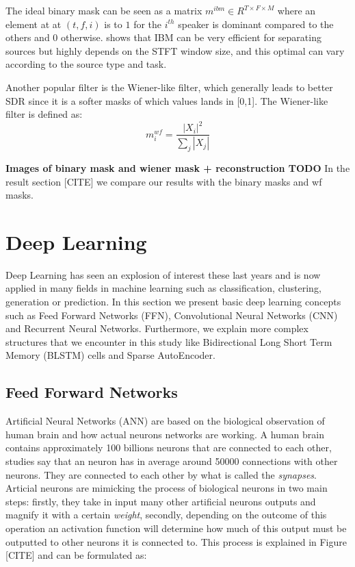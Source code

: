 \documentclass[master,final,11pt]{iscs-thesis}
\begin{document}
The ideal binary mask can be seen as a matrix $m^{ibm} \in R^{T\times F \times M}$ where an element at at $(t,f,i)$ is to $1$ for the $i^{th}$ speaker is dominant compared to the others and $0$ otherwise. \cite{IBM} shows that IBM can be very efficient for separating sources but highly depends on the STFT window size, and this optimal can vary according to the source type and task.

Another popular filter is the Wiener-like filter, which generally leads to better SDR since it is a softer masks of which values lands in [0,1]. The Wiener-like filter is defined as:
\[
m^{wf}_i = \frac{|X_i|^2}{\sum_j{|X_j|}} 
\]

\textbf{Images of binary mask and wiener mask + reconstruction TODO}
In the result section [CITE] we compare our results with the binary masks and wf masks.

\section{Deep Learning}

Deep Learning \cite{DL, DLBOOK} has seen an explosion of interest these last years and is now applied in many fields in machine learning such as classification, clustering, generation or prediction. In this section we present basic deep learning concepts such as Feed Forward Networks (FFN), Convolutional Neural Networks (CNN) and Recurrent Neural Networks. Furthermore, we explain more complex structures that we encounter in this study like Bidirectional Long Short Term Memory (BLSTM) cells and Sparse AutoEncoder.

\subsection{Feed Forward Networks}

Artificial Neural Networks (ANN) are based on the biological observation of human brain and how actual neurons networks are working. A human brain contains approximately 100 billions neurons that are connected to each other, studies say that an neuron has in average around 50000 connections with other neurons. They are connected to each other by what is called the \textit{synapses}.
Articial neurons are mimicking the process of biological neurons in two main steps: firstly, they take in input many other artificial neurons outputs and magnify it with a certain \textit{weight}, secondly, depending on the outcome of this operation an activation function will determine how much of this output must be outputted to other neurons it is connected to. This process is explained in Figure [CITE] and can be formulated as:
\end{document}
